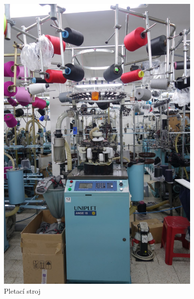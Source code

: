 \begin{figure}[htbp]
    \centering
    \includegraphics[width=0.9\textwidth]{img/pletacka.png}
    \caption{Pletací stroj}
    \label{fig:pletacka}
\end{figure}

\newpage